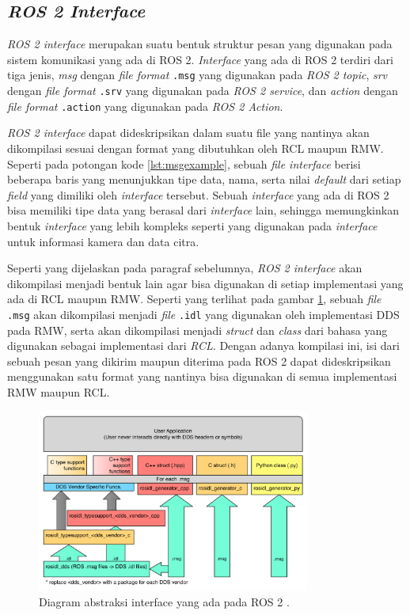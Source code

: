 \subsection{\emph{ROS 2 Interface}}
\label{subsec:ros2interface}

\emph{ROS 2 interface} merupakan suatu bentuk struktur pesan yang digunakan pada sistem komunikasi yang ada di ROS 2.
\emph{Interface} yang ada di ROS 2 terdiri dari tiga jenis,
  \emph{msg} dengan \emph{file format} \lstinline{.msg} yang digunakan pada \emph{ROS 2 topic},
  \emph{srv} dengan \emph{file format} \lstinline{.srv} yang digunakan pada \emph{ROS 2 service},
  dan \emph{action} dengan \emph{file format} \lstinline{.action} yang digunakan pada \emph{ROS 2 Action}.

\emph{ROS 2 interface} dapat dideskripsikan dalam suatu file yang nantinya akan dikompilasi sesuai dengan format yang dibutuhkan oleh RCL maupun RMW.
Seperti pada potongan kode \ref{lst:msgexample},
  sebuah \emph{file interface} berisi beberapa baris yang menunjukkan tipe data, nama, serta nilai \emph{default} dari setiap \emph{field} yang dimiliki oleh \emph{interface} tersebut.
Sebuah \emph{interface} yang ada di ROS 2 bisa memiliki tipe data yang berasal dari \emph{interface} lain,
  sehingga memungkinkan bentuk \emph{interface} yang lebih kompleks seperti yang digunakan pada \emph{interface} untuk informasi kamera dan data citra.



Seperti yang dijelaskan pada paragraf sebelumnya,
  \emph{ROS 2 interface} akan dikompilasi menjadi bentuk lain agar bisa digunakan di setiap implementasi yang ada di RCL maupun RMW.
Seperti yang terlihat pada gambar \ref{fig:diagraminterfaceros2},
  sebuah \emph{file} \lstinline{.msg} akan dikompilasi menjadi \emph{file} \lstinline{.idl} yang digunakan oleh implementasi DDS pada RMW,
  serta akan dikompilasi menjadi \emph{struct} dan \emph{class} dari bahasa yang digunakan sebagai implementasi dari \emph{RCL}.
Dengan adanya kompilasi ini,
  isi dari sebuah pesan yang dikirim maupun diterima pada ROS 2 dapat dideskripsikan menggunakan satu format yang nantinya bisa digunakan di semua implementasi RMW maupun RCL.

\begin{figure}
  \centering
  \includegraphics[width=0.8\textwidth,keepaspectratio]{gambar/diagram-interface-ros2.png}
  \caption{Diagram abstraksi interface yang ada pada ROS 2 \citep{url:ros2interfacesconcept}.}
  \label{fig:diagraminterfaceros2}
\end{figure}
